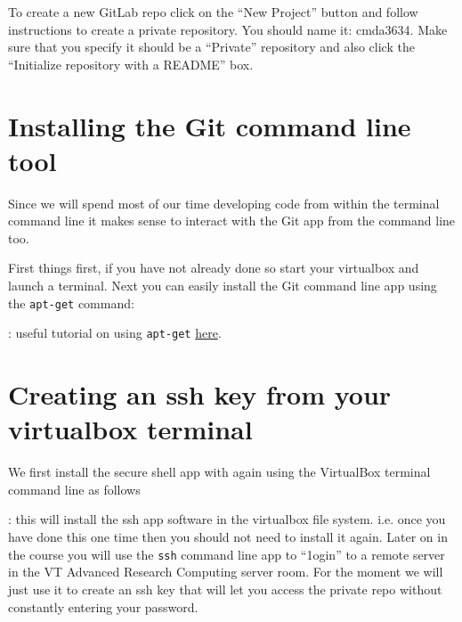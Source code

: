 To create a new GitLab repo click on the ``New Project'' button and follow instructions to create a private repository. You should name it:  cmda3634. Make sure that you specify it should be a ``Private'' repository and also click the ``Initialize repository with a README'' box.


\FloatBarrier


\newpage
\section{Installing the Git command line tool}

Since we will spend most of our time developing code from within the terminal command line it makes sense to interact with the Git app from the command line too. 

First things first, if you have not already done so start your virtualbox and launch a terminal. Next you can easily install the Git command line app using the \verb|apt-get| command:


\vspace{8pt}: useful tutorial on using \verb|apt-get| \href{https://codeburst.io/a-beginners-guide-to-using-apt-get-commands-in-linux-ubuntu-d5f102a56fc4}{here}.

\section{Creating an ssh key from your virtualbox terminal}

We first install the secure shell app with again using the VirtualBox terminal command line as follows


\vspace{8pt}: this will install the ssh app software in the virtualbox file system. i.e. once you have done this one time then you should not need to install it again. Later on in the course you will use the \verb|ssh| command line app to ``1ogin'' to a remote server in the VT Advanced Research Computing server room. For the moment we will just use it to create an ssh key that will let you access the private repo without constantly entering your password.

